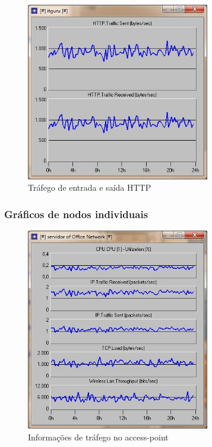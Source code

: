 \documentclass[brazil,times,12pt]{abnt}
\begin{document}
\begin{figure}[htp]
\begin{center}
  \includegraphics[width=80mm]{SimulacaoRede/TrafegoHTTP.jpg}
  \caption[trafego-http]{Tráfego de entrada e saída HTTP}
  \label{trafego-http}
\end{center}
\end{figure}

\subsubsection*{Gráficos de nodos individuais}

\begin{figure}[H]
\begin{center}
  \includegraphics[width=80mm]{SimulacaoRede/AccessPoint.jpg}
  \caption[trafego-access-point]{Informações de tráfego no access-point}
  \label{trafego-access-point}
\end{center}
\end{figure}
\end{document}
